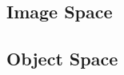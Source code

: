 \documentclass[11pt, oneside]{scrartcl}   	%
\begin{document}
\subsection{Image Space}


\subsection{Object Space}
\end{document}
